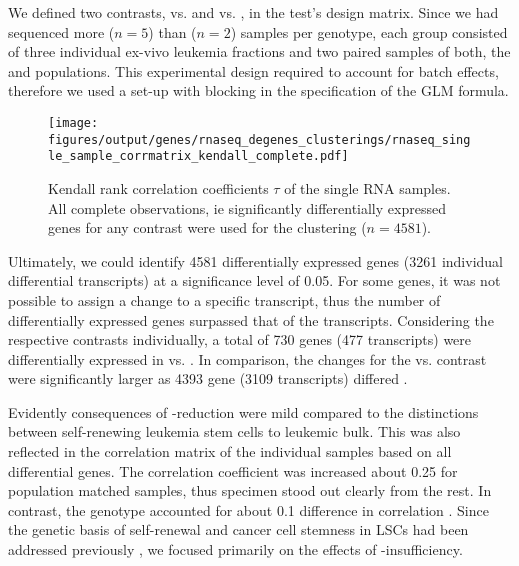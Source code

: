 We defined two contrasts, \dnmtchip vs. \dnmtwt and \kithi vs. \kitlow, in the test's design matrix. Since we had sequenced more \kithi ($n\!= \!5$) than \kitlow ($n\!= \!2$) samples per genotype, each group consisted of three individual ex-vivo leukemia \kithi fractions and two paired samples of both, the \kithi and \kitlow populations. This experimental design required to account for batch effects, therefore we used a set-up with blocking in the specification of the GLM formula. 

\begin{figure}[!ht]
	\texttt{[image: figures/output/genes/rnaseq\_degenes\_clusterings/rnaseq\_single\_sample\_corrmatrix\_kendall\_complete.pdf]} 
	\caption{Kendall rank correlation coefficients \ensuremath{\tau} of the single RNA samples. All complete observations, ie significantly differentially expressed genes for any contrast were used for the clustering ($n\!= \!4581$).}
	\label{fig:genes:single_sample_corrmatrix_kendall_complete}
\end{figure}

Ultimately, we could identify \num{4581} differentially expressed genes (\num{3261} individual differential transcripts) at a significance level of \num{0.05}. For some genes, it was not possible to assign a change to a specific transcript, thus the number of differentially expressed genes surpassed that of the transcripts. Considering the respective contrasts individually, a total of \num{730} genes (\num{477} transcripts) were differentially expressed in \dnmtchip vs. \dnmtwt {}. In comparison, the changes for the \kithi vs. \kitlow contrast were significantly larger as \num{4393} gene (\num{3109} transcripts) differed .

 Evidently consequences of -reduction were mild compared to the distinctions between self-renewing leukemia stem cells to leukemic bulk. This was also reflected in the correlation matrix of the individual samples based on all differential genes. The correlation coefficient was increased about \num{0.25} for population matched samples, thus \kitlow specimen stood out clearly from the rest. In contrast, the genotype accounted for about \num{0.1} difference in correlation . Since the genetic basis of self-renewal and cancer cell stemness in LSCs had been addressed previously \cite{Chen2008,Somervaille2009,Gentles2010,Eppert2011,Cabezas-Wallscheid2013,Corces2016,Stavropoulou2016} , we focused primarily on the effects of -insufficiency. 
 
